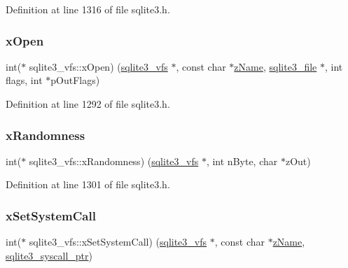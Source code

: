 Definition at line 1316 of file sqlite3.\+h.

\mbox{\label{structsqlite3__vfs_ab106b445eb5d372266a1108fc982a9aa}} 
\subsubsection{\texorpdfstring{x\+Open}{xOpen}}
{\footnotesize\ttfamily int($\ast$ sqlite3\+\_\+vfs\+::x\+Open) (\mbox{\hyperlink{structsqlite3__vfs}{sqlite3\+\_\+vfs}} $\ast$, const char $\ast$\mbox{\hyperlink{structsqlite3__vfs_a0f06a27ac2201ea04c0623ef19e5d73e}{z\+Name}}, \mbox{\hyperlink{structsqlite3__file}{sqlite3\+\_\+file}} $\ast$, int flags, int $\ast$p\+Out\+Flags)}



Definition at line 1292 of file sqlite3.\+h.

\mbox{\label{structsqlite3__vfs_ac74c20a91cbd440ed72b11de4c4333ea}} 
\subsubsection{\texorpdfstring{x\+Randomness}{xRandomness}}
{\footnotesize\ttfamily int($\ast$ sqlite3\+\_\+vfs\+::x\+Randomness) (\mbox{\hyperlink{structsqlite3__vfs}{sqlite3\+\_\+vfs}} $\ast$, int n\+Byte, char $\ast$z\+Out)}



Definition at line 1301 of file sqlite3.\+h.

\mbox{\label{structsqlite3__vfs_a444cd80f79ea4994f72551bb9f403866}} 
\subsubsection{\texorpdfstring{x\+Set\+System\+Call}{xSetSystemCall}}
{\footnotesize\ttfamily int($\ast$ sqlite3\+\_\+vfs\+::x\+Set\+System\+Call) (\mbox{\hyperlink{structsqlite3__vfs}{sqlite3\+\_\+vfs}} $\ast$, const char $\ast$\mbox{\hyperlink{structsqlite3__vfs_a0f06a27ac2201ea04c0623ef19e5d73e}{z\+Name}}, \mbox{\hyperlink{sqlite3_8h_a99a6393e96d7095fa024de9c1257aa6f}{sqlite3\+\_\+syscall\+\_\+ptr}})}



